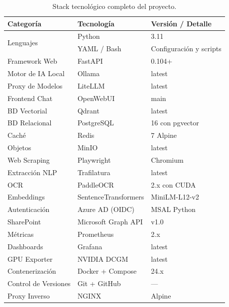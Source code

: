 \begin{table}[H]
\centering
\caption{Stack tecnológico completo del proyecto.}
\label{tab:stack}
\begin{tabular}{lll}
\toprule
\textbf{Categoría} & \textbf{Tecnología} & \textbf{Versión / Detalle} \\
\midrule
\multirow{2}{*}{Lenguajes}      & Python      & 3.11 \\
                                  & YAML / Bash & Configuración y scripts \\
\midrule
Framework Web       & FastAPI      & 0.104+ \\
Motor de IA Local   & Ollama       & latest  \\
Proxy de Modelos    & LiteLLM      & latest  \\
Frontend Chat       & OpenWebUI    & main \\
\midrule
BD Vectorial        & Qdrant       & latest \\
BD Relacional       & PostgreSQL   & 16 con pgvector \\
Caché               & Redis        & 7 Alpine \\
Objetos             & MinIO        & latest \\
\midrule
Web Scraping        & Playwright   & Chromium \\
Extracción NLP      & Trafilatura  & latest \\
OCR                 & PaddleOCR    & 2.x con CUDA \\
\midrule
Embeddings          & SentenceTransformers & MiniLM-L12-v2 \\
Autenticación       & Azure AD (OIDC) & MSAL Python \\
SharePoint          & Microsoft Graph API & v1.0 \\
\midrule
Métricas            & Prometheus   & 2.x \\
Dashboards          & Grafana      & latest \\
GPU Exporter        & NVIDIA DCGM  & latest \\
\midrule
Contenerización     & Docker + Compose & 24.x \\
Control de Versiones& Git + GitHub & --- \\
Proxy Inverso       & NGINX        & Alpine \\
\bottomrule
\end{tabular}
\end{table}

